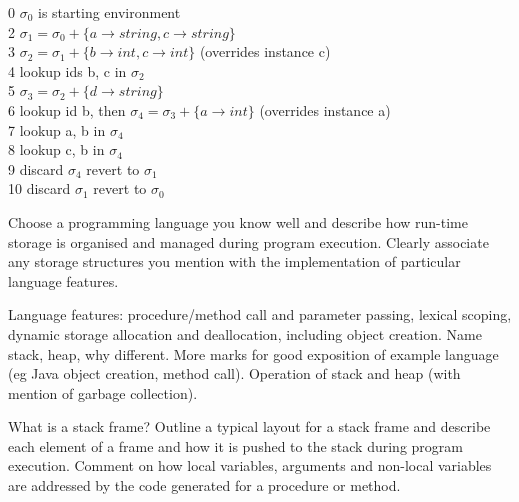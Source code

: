 \documentclass[11pt]{bareexam}
\begin{document}
\begin{questions}
\begin{subquestions}
\begin{modelanswer}
0  $\sigma_0$ is starting environment\\
2  $\sigma_1 = \sigma_0 + \{a\rightarrow string,c\rightarrow string\}$\\
3  $\sigma_2 = \sigma_1 + \{b\rightarrow int,c\rightarrow int\}$ (overrides instance c)\\
4  lookup ids b, c  in $\sigma_2$\\
5  $\sigma_3 = \sigma_2 + \{d\rightarrow string\}$ \\
6  lookup id b, then $\sigma_4 = \sigma_3 + \{a\rightarrow int\}$ (overrides instance a)\\
7  lookup a, b  in $\sigma_4$\\
8  lookup c, b in $\sigma_4$\\
9  discard $\sigma_4$ revert to $\sigma_1$\\
10 discard $\sigma_1$ revert to $\sigma_0$
\end{modelanswer}


\end{subquestions}

\newpage

\question


\begin{subquestions}

\subquestion
Choose a programming language you know well and describe
how run-time storage is organised and managed during program 
execution.
Clearly associate any storage structures you
mention with the implementation of particular 
language features.

\begin{modelanswer}
Language features: procedure/method call and parameter passing,
lexical scoping, dynamic storage allocation and deallocation,
including object creation. Name stack, heap, why different.
More marks for good exposition of example language
(eg Java object creation, method call). Operation of
stack and heap (with mention of garbage collection).
\end{modelanswer}


\subquestion
What is a stack frame?
Outline a typical layout for a stack frame and describe 
each element of a frame 
and how it is pushed to the stack during
program execution. 
Comment on how local variables, arguments and non-local variables
are addressed by the code generated for a procedure or method. 


\end{subquestions}
\end{questions}
\end{document}

